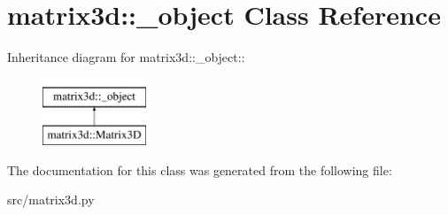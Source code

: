 \hypertarget{classmatrix3d_1_1__object}{
\section{matrix3d::\_\-object Class Reference}
\label{d7/d99/classmatrix3d_1_1__object}
}
Inheritance diagram for matrix3d::\_\-object::\begin{figure}[H]
\begin{center}
\leavevmode
\includegraphics[height=2cm]{d7/d99/classmatrix3d_1_1__object}
\end{center}
\end{figure}


The documentation for this class was generated from the following file:\begin{DoxyCompactItemize}
\item 
src/matrix3d.py\end{DoxyCompactItemize}
